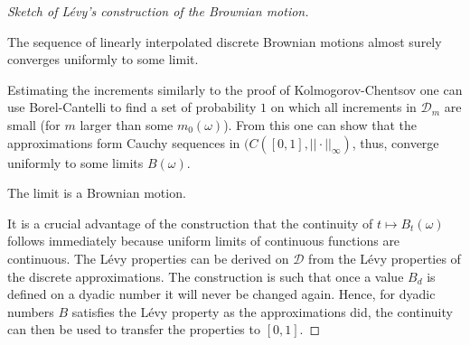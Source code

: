 \begin{proof}[Sketch of L\'evy's construction of the Brownian motion]
\begin{lstep}
	The sequence of linearly interpolated discrete Brownian motions almost surely converges uniformly to some limit.
\end{lstep}
Estimating the increments similarly to the proof of Kolmogorov-Chentsov one can use Borel-Cantelli to find a set of probability $1$ on which all increments in $\mathcal D_m$ are small (for $m$ larger than some $m_0(\omega)$). From this one can show that the approximations form Cauchy sequences in $(C([0,1],||\cdot||_\infty)$, thus, converge uniformly to some limits $B(\omega)$.
\begin{lstep}
	The limit is a Brownian motion.
\end{lstep}
It is a crucial advantage of the construction that the continuity of $t\mapsto B_t(\omega)$ follows immediately because uniform limits of continuous functions are continuous. The L\'evy properties can be derived on $\mathcal D$ from the L\'evy properties of the discrete approximations. The construction is such that once a value $B_d$ is defined on a dyadic number it will never be changed again. Hence, for dyadic numbers $B$ satisfies the L\'evy property as the approximations did, the continuity can then be used to transfer the properties to $[0,1]$.

\end{proof}
